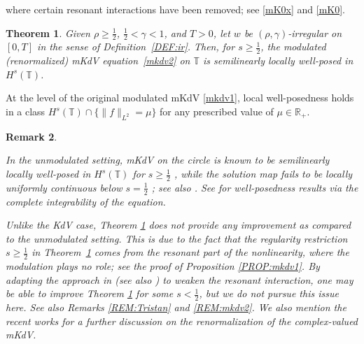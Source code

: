 \documentclass[letterpaper, 11pt,  reqno]{amsart}
\newtheorem{theorem}{Theorem} [section]
\newtheorem{remark}[theorem]{Remark}
\newcommand{\1}{\hspace{0.5mm}\text{I}\hspace{0.5mm}}
\newcommand{\noi}{\noindent}
\newcommand{\R}{\mathbb{R}}
\newcommand{\T}{\mathbb{T}}
\newcommand{\g}{\gamma}
\numberwithin{equation}{section}
\numberwithin{theorem}{section}
\begin{document}
\noi
where certain resonant interactions have been removed;
see \eqref{mK0x} and \eqref{mK0}.




\begin{theorem}
\label{THM:3}
Given $\rho \ge \frac 12$,  $\frac12< \g < 1$, and $T> 0$, 
let  $w$ be $(\rho,\g)$-irregular on $[0, T]$ in the sense of Definition~\ref{DEF:ir}.
Then, for $s\geq \frac 12$, 
the modulated \textup{(}renormalized\textup{)} mKdV equation~\eqref{mkdv2}
on $\T$
is semilinearly  locally well-posed in $H^s(\T)$.

\end{theorem}


At the level of the original modulated mKdV \eqref{mkdv1}, 
local well-posedness holds
in a class $H^s(\T) \cap \{ \|f \|_{L^2} = \mu\}$
for any prescribed value of  $\mu \in \R_+$.











\begin{remark}\label{REM:mkdv1}\rm

In the unmodulated setting, 
mKdV on the circle is known to be semilinearly locally well-posed in 
$H^s(\T)$ for $s \ge \frac 12$
\cite{BO93, KO}, 
while 
 the solution map
fails to be locally 
uniformly continuous below $s = \frac 12$
\cite{CCT, TT}; see also \cite{BO97}.
See \cite{KT2, Forlano}
for well-posedness results via the complete integrability of the equation.

Unlike the KdV case, 
Theorem \ref{THM:3}
does not provide any improvement as compared to the unmodulated setting.
This is due to the fact that 
the regularity restriction $s \ge \frac 12$  in Theorem~\ref{THM:3}
comes from  the resonant part of the nonlinearity, 
where the modulation plays no role;
see the proof of Proposition \ref{PROP:mkdv1}.
By adapting  the approach in  \cite{TT, NTT}
(see also \cite{OTzW, BLLZ})
to weaken the resonant interaction,
one may be able to improve Theorem \ref{THM:3} for some $s  < \frac 12$, 
but we do not pursue this issue here.
See also Remarks \ref{REM:Tristan} and \ref{REM:mkdv2}.
We also mention the recent works
 \cite{C1, C2}
for a further discussion on the renormalization of the complex-valued mKdV.


\end{remark}


\end{document}
